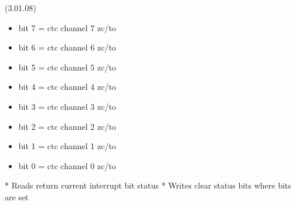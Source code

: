  (3.01.08)\\
\begin{itemize}
\item bit 7 = ctc channel 7 zc/to
\item bit 6 = ctc channel 6 zc/to
\item bit 5 = ctc channel 5 zc/to
\item bit 4 = ctc channel 4 zc/to
\item bit 3 = ctc channel 3 zc/to
\item bit 2 = ctc channel 2 zc/to
\item bit 1 = ctc channel 1 zc/to
\item bit 0 = ctc channel 0 zc/to
\end{itemize}
* Reads return current interrupt bit status
* Writes clear status bits where bits are set
